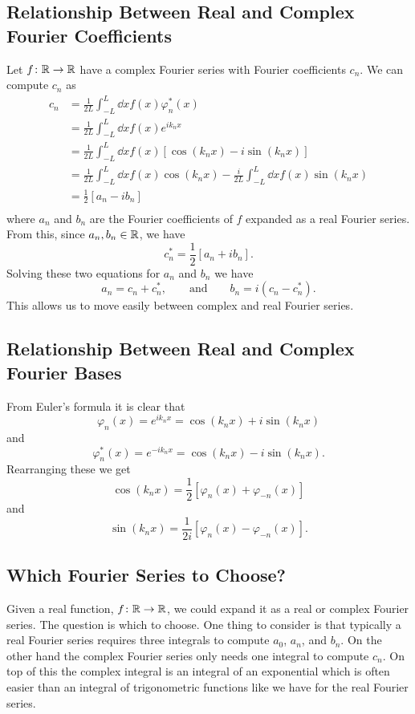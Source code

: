 \documentclass[a4paper]{article}
\begin{document}
    \subsection{Relationship Between Real and Complex Fourier Coefficients}
    Let \(f\colon\mathbb{R}\to\mathbb{R}\) have a complex Fourier series with Fourier coefficients \(c_n\).
    We can compute \(c_n\) as
    \begin{align*}
        c_n &= \frac{1}{2L}\int_{-L}^{L} \dd{x} f(x)\varphi_n^*(x)\\
        &= \frac{1}{2L}\int_{-L}^{L} \dd{x} f(x) e^{ik_nx}\\
        &= \frac{1}{2L}\int_{-L}^{L} \dd{x} f(x)[\cos(k_nx) - i\sin(k_nx)]\\
        &= \frac{1}{2L}\int_{-L}^{L} \dd{x} f(x)\cos(k_nx) - \frac{i}{2L}\int_{-L}^{L} \dd{x} f(x)\sin(k_nx)\\
        &= \frac{1}{2}[a_n - ib_n]\\
    \end{align*}
    where \(a_n\) and \(b_n\) are the Fourier coefficients of \(f\) expanded as a real Fourier series.
    From this, since \(a_n, b_n\in\mathbb{R}\), we have
    \[c_n^* = \frac{1}{2}[a_n + ib_n].\]
    Solving these two equations for \(a_n\) and \(b_n\) we have
    \[a_n = c_n + c_n^*,\qquad\text{and}\qquad b_n = i(c_n - c_n^*).\]
    This allows us to move easily between complex and real Fourier series.
    
    \subsection{Relationship Between Real and Complex Fourier Bases}
    From Euler's formula it is clear that
    \[\varphi_n(x) = e^{ik_nx} = \cos(k_nx) + i\sin(k_nx)\]
    and
    \[\varphi_n^*(x) = e^{-ik_nx} = \cos(k_nx) - i\sin(k_nx).\]
    Rearranging these we get
    \[\cos(k_nx) = \frac{1}{2}[\varphi_n(x) + \varphi_{-n}(x)]\]
    and
    \[\sin(k_nx) = \frac{1}{2i}[\varphi_n(x) - \varphi_{-n}(x)].\]
    
    \subsection{Which Fourier Series to Choose?}
    Given a real function, \(f\colon\mathbb{R}\to\mathbb{R}\), we could expand it as a real or complex Fourier series.
    The question is which to choose.
    One thing to consider is that typically a real Fourier series requires three integrals to compute \(a_0\), \(a_n\), and \(b_n\).
    On the other hand the complex Fourier series only needs one integral to compute \(c_n\).
    On top of this the complex integral is an integral of an exponential which is often easier than an integral of trigonometric functions like we have for the real Fourier series.
    
\end{document}
